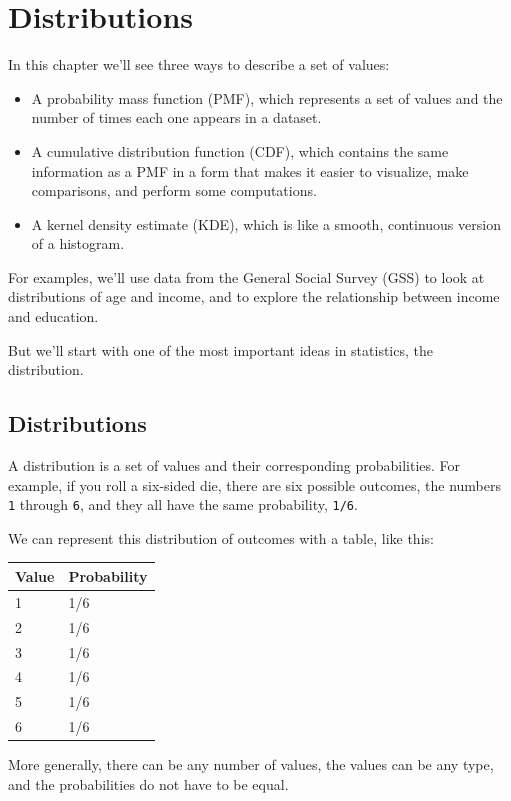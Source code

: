\hypertarget{distributions}{%
\chapter{Distributions}\label{distributions}}

In this chapter we'll see three ways to describe a set of values:

\begin{itemize}
\item
  A probability mass function (PMF), which represents a set of values
  and the number of times each one appears in a dataset.
\item
  A cumulative distribution function (CDF), which contains the same
  information as a PMF in a form that makes it easier to visualize, make
  comparisons, and perform some computations.
\item
  A kernel density estimate (KDE), which is like a smooth, continuous
  version of a histogram.
\end{itemize}

For examples, we'll use data from the General Social Survey (GSS) to
look at distributions of age and income, and to explore the relationship
between income and education.

But we'll start with one of the most important ideas in statistics, the
distribution.

\hypertarget{distributions-1}{%
\section{Distributions}\label{distributions-1}}

A distribution is a set of values and their corresponding probabilities.
For example, if you roll a six-sided die, there are six possible
outcomes, the numbers \passthrough{\lstinline!1!} through
\passthrough{\lstinline!6!}, and they all have the same probability,
\passthrough{\lstinline!1/6!}.

We can represent this distribution of outcomes with a table, like this:

\begin{longtable}[]{@{}ll@{}}
\toprule
Value & Probability\tabularnewline
\midrule
\endhead
1 & 1/6\tabularnewline
2 & 1/6\tabularnewline
3 & 1/6\tabularnewline
4 & 1/6\tabularnewline
5 & 1/6\tabularnewline
6 & 1/6\tabularnewline
\bottomrule
\end{longtable}

More generally, there can be any number of values, the values can be any
type, and the probabilities do not have to be equal.

